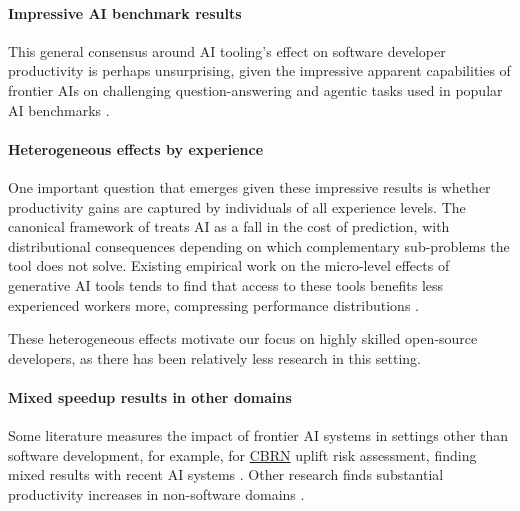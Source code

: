 \documentclass{article}
\begin{document}

\paragraph*{Impressive AI benchmark results}
This general consensus around AI tooling's effect on software developer productivity is perhaps unsurprising, given the impressive apparent capabilities of frontier AIs on challenging question-answering and agentic tasks used in popular AI benchmarks \cite{openai2025o3o4mini, anthropic2025claude4}.

\paragraph*{Heterogeneous effects by experience}
One important question that emerges given these impressive results is whether productivity gains are captured by individuals of all experience levels. 
The canonical framework of \citet{AmbiguousLaborMarket} treats AI as a fall in the cost of prediction, with distributional consequences depending on which complementary sub-problems the tool does not solve. 
Existing empirical work on the micro-level effects of generative AI tools tends to find that access to these tools benefits less experienced workers more, compressing performance distributions \cite{brynjolfsson2023generativeaiatwork, noy2023experimental, peng2023impactaideveloperproductivity, choi2024ai}. %

These heterogeneous effects motivate our focus on highly skilled open‑source developers, as there has been relatively less research in this setting. 

\paragraph*{Mixed speedup results in other domains}
Some literature measures the impact of frontier AI systems in settings other than software development, for example, for \href{https://en.wikipedia.org/wiki/CBRN_defense}{CBRN} uplift risk assessment, finding mixed results with recent AI systems \cite{anthropic2024claude3, mouton2024operational, grattafiori2024llama3herdmodels, patwardhan2024earlywarning}. 
Other research finds substantial productivity increases in non-software domains \cite{brynjolfsson2023generativeaiatwork, noy2023experimental}.
\end{document}
